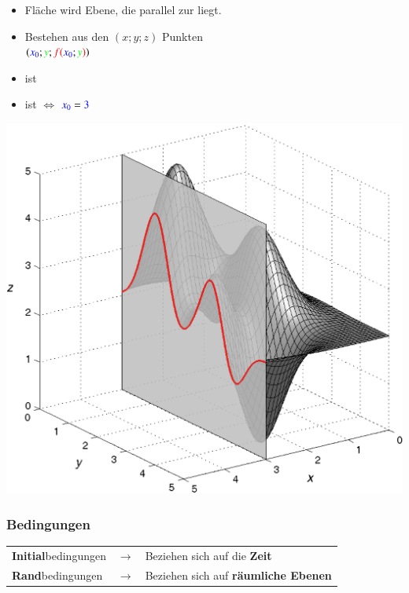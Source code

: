 \hfill
\begin{minipage}[t]{0.48\columnwidth}
    \textbf{}
    \begin{itemize}
        \item Fläche wird  Ebene, die parallel zur  liegt.
        \item Bestehen aus den $(x;y;z)$ Punkten\\
        $({\color{blue}x_0};{\color{green}y};{\color{red}f(}{\color{blue}x_0};{\color{green}y}{\color{red})})$
        \item {} ist 
        \item {} ist  $\Leftrightarrow$ ${{\color{blue}x_0} = {\color{blue}3}}$
    \end{itemize}
    \includegraphics[width=\columnwidth]{images/schnitt_x0.png}
\end{minipage}

\subsubsection{Bedingungen}

\begin{tabular}{l l l}
    \textbf{Initial}bedingungen & $\rightarrow$ & Beziehen sich auf die \textbf{Zeit}\\
    \textbf{Rand}bedingungen & $\rightarrow$ & Beziehen sich auf \textbf{räumliche Ebenen}
\end{tabular}

